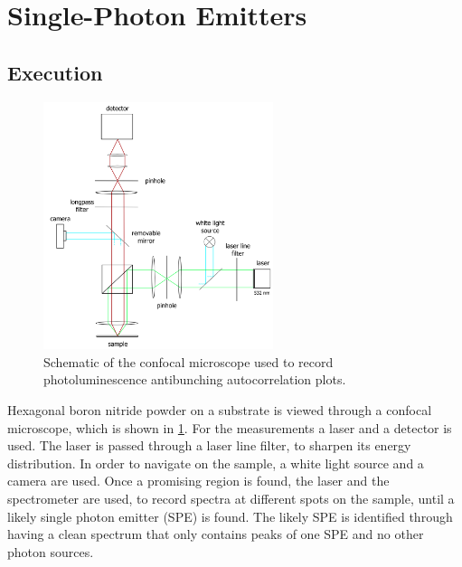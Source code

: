\section{Single-Photon Emitters}
\label{sec:SPE}

\subsection{Execution}

\begin{figure}[H]
    \centering
    \includegraphics[width=0.6\textwidth]{img/setup2.png}
    \caption{Schematic of the confocal microscope used to record photoluminescence antibunching autocorrelation plots.}
    \label{fig_confocal}
\end{figure}

Hexagonal boron nitride powder on a substrate is viewed through a confocal microscope, which is shown in \cref{fig_confocal}.
For the measurements a laser and a detector is used.
The laser is passed through a laser line filter, to sharpen its energy distribution.
In order to navigate on the sample, a white light source and a camera are used.
Once a promising region is found, the laser and the spectrometer are used, to record spectra at different spots on the sample, until a likely single photon emitter (SPE) is found.
The likely SPE is identified through having a clean spectrum that only contains peaks of one SPE and no other photon sources.

